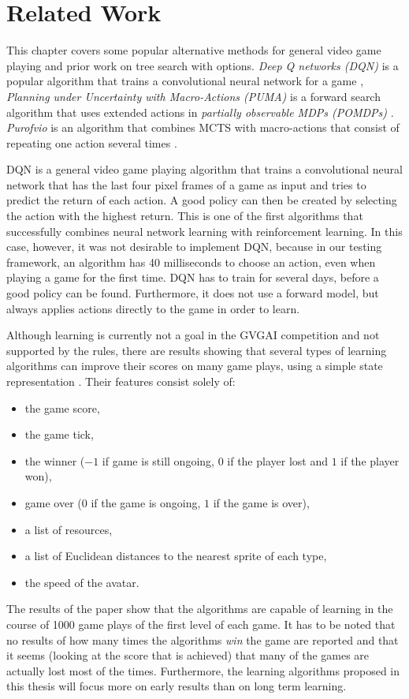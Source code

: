 \chapter{Related Work}
\label{sec:related}
This chapter covers some popular alternative methods for general video game
playing and prior work on tree search with options. \emph{Deep Q networks (DQN)}
is a popular algorithm that trains a convolutional neural network for a game
\cite{mnih2013playing}, \emph{Planning under Uncertainty with Macro-Actions
(PUMA)} is a forward search algorithm that uses extended actions in
\emph{partially observable MDPs (POMDPs)} \cite{he2010puma}.  \emph{Purofvio} is
an algorithm that combines MCTS with macro-actions that consist of repeating one
action several times \cite{powley2012monte}. 

DQN is a general video game playing algorithm that trains a convolutional neural
network that has the last four pixel frames of a game as input and tries to
predict the return of each action. A good policy can then be created by
selecting the action with the highest return. This is one of the first
algorithms that successfully combines neural network learning with reinforcement
learning. In this case, however, it was not desirable to implement DQN, because
in our testing framework, an algorithm has 40 milliseconds to choose an action,
even when playing a game for the first time. DQN has to train for several days,
before a good policy can be found.  Furthermore, it does not use a forward
model, but always applies actions directly to the game in order to learn.

Although learning is currently not a goal in the GVGAI competition and not
supported by the rules, there are results showing that several types of learning
algorithms can improve their scores on many game plays, using a simple state
representation \cite{samothrakis2015neuroevolution}. Their features consist
solely of: 
\begin{itemize}[noitemsep]
	\item the game score, 
	\item the game tick,
	\item the winner ($-1$ if game is still ongoing, $0$ if the player lost and
		$1$ if the player won), 
	\item game over ($0$ if the game is ongoing, $1$ if the game is over), 
	\item a list of resources, 
	\item a list of Euclidean distances to the nearest sprite of each type,
	\item the speed of the avatar. 
\end{itemize}
The results of the paper show that the algorithms are capable of learning in the
course of 1000 game plays of the first level of each game. It has to be noted
that no results of how many times the algorithms \emph{win} the game are
reported and that it seems (looking at the score that is achieved) that many of
the games are actually lost most of the times. Furthermore, the learning
algorithms proposed in this thesis will focus more on early results than on long
term learning.

